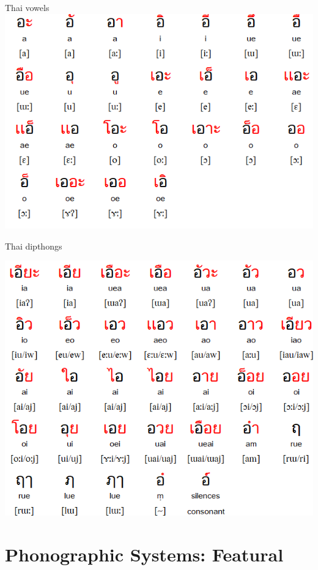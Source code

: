 \documentclass[xetex]{beamer}
\begin{document}
\begin{frame}{Thai vowels}
  \includegraphics[width=\textwidth]{pics/thai_vwl_1}
\end{frame}
\begin{frame}{Thai dipthongs}
  \begin{center}
  \includegraphics[height=0.8\textheight]{pics/thai_vwl_2}
\end{center}
\end{frame}


\section{Phonographic Systems: Featural}
\end{document}
